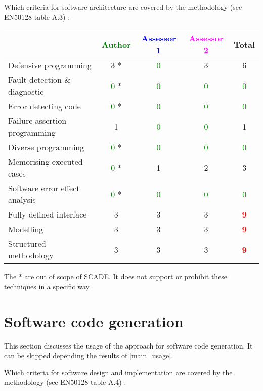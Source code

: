 Which criteria for software architecture are covered by the methodology
(see EN50128 table A.3) :

\begin{tabular}{|l | c | c | c | c|}
\hline
& \textcolor{green}{Author} & \textcolor{blue}{Assessor 1} & \textcolor{magenta}{Assessor 2} & Total \\
\hline
Defensive programming  & 3    * & \textcolor{green}{0} &3 &  6 \\
\hline 
Fault detection \& diagnostic  & \textcolor{green}{0} * & \textcolor{green}{0} & \textcolor{green}{0}   & \textcolor{green}{0} \\
\hline
Error detecting code  & \textcolor{green}{0} * & \textcolor{green}{0} & \textcolor{green}{0}   & \textcolor{green}{0} \\
\hline
Failure assertion programming & 1     & \textcolor{green}{0} & \textcolor{green}{0}   & 1     \\
\hline
Diverse programming & \textcolor{green}{0} * & \textcolor{green}{0} & \textcolor{green}{0}   & \textcolor{green}{0} \\
\hline
Memorising executed cases & \textcolor{green}{0} * & 1     &2 & 3     \\
\hline
Software error effect analysis & \textcolor{green}{0} * & \textcolor{green}{0} & \textcolor{green}{0}   & \textcolor{green}{0} \\
\hline
Fully defined interface & 3     & 3     &3 & \textcolor{red}{\textbf{9}} \\
\hline
Modelling  & 3     & 3     &3 & \textcolor{red}{\textbf{9}} \\
\hline
Structured methodology & 3     & 3     &3 & \textcolor{red}{\textbf{9}} \\
\hline
\end{tabular}

\begin{author_comment}
The * are out of scope of SCADE. It does not support or prohibit these techniques in a specific way.   
\end{author_comment}


\section{Software code generation}
This section discusses the usage of the approach for software code generation.
It can be skipped depending the results of \ref{main_usage}.

Which criteria for software design and implementation are covered by the methodology
(see EN50128 table A.4) :

